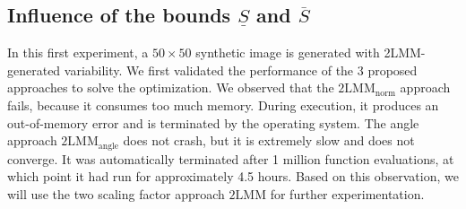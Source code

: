 \subsection{Influence of the bounds $\underline{S}$ and $\overline{S}$} \label{sec: influence of bounds}
In this first experiment, a $50 \times 50$ synthetic image is generated with 2LMM-generated variability. 
We first validated the performance of the 3 proposed approaches to solve the optimization. We observed that the $\mathrm{2LMM}_\mathrm{norm}$ approach fails, because it consumes too much memory. During execution, it produces an out-of-memory error and is terminated by the operating system. The angle approach $\mathrm{2LMM}_\mathrm{angle}$ does not crash, but it is extremely slow and does not converge. It was automatically terminated after 1 million function evaluations, at which point it had run for approximately 4.5 hours. Based on this observation, we will use the two scaling factor approach $\mathrm{2LMM}$ for further experimentation.

